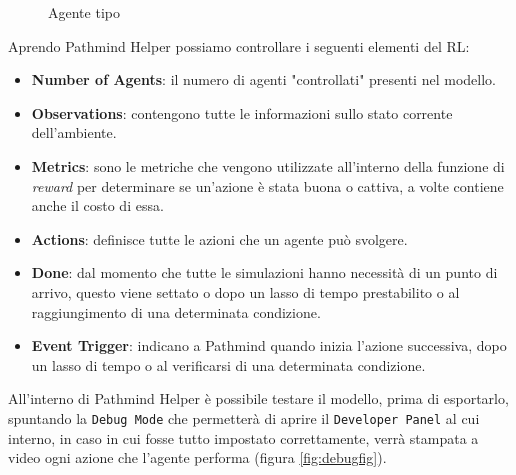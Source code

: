 \begin{figure}[!h]
    \centering
    \caption{Agente tipo}
    \label{fig:AIagent}
\end{figure}

Aprendo Pathmind Helper possiamo controllare i seguenti elementi del RL:
\begin{itemize}
\item \textbf{Number of Agents}: il numero di agenti "controllati" presenti nel modello.
\item \textbf{Observations}: contengono tutte le informazioni sullo stato corrente dell'ambiente.
\item \textbf{Metrics}: sono le metriche che vengono utilizzate all'interno della funzione di \textit{reward} per determinare se un'azione è stata buona o cattiva, a volte contiene anche il costo di essa. 
\item \textbf{Actions}: definisce tutte le azioni che un agente può svolgere.
\item \textbf{Done}: dal momento che tutte le simulazioni hanno necessità di un punto di arrivo, questo viene settato o dopo un lasso di tempo prestabilito o al raggiungimento di una determinata condizione.
\item \textbf{Event Trigger}: indicano a Pathmind quando inizia l'azione successiva, dopo un lasso di tempo o al verificarsi di una determinata condizione. 
\end{itemize}




All'interno di Pathmind Helper è possibile testare il modello, prima di esportarlo, spuntando la \texttt{Debug Mode} che permetterà di aprire il \texttt{Developer Panel} al cui interno, 
in caso in cui fosse tutto impostato correttamente, verrà stampata a video ogni azione che l'agente performa (figura \ref{fig:debugfig}).

